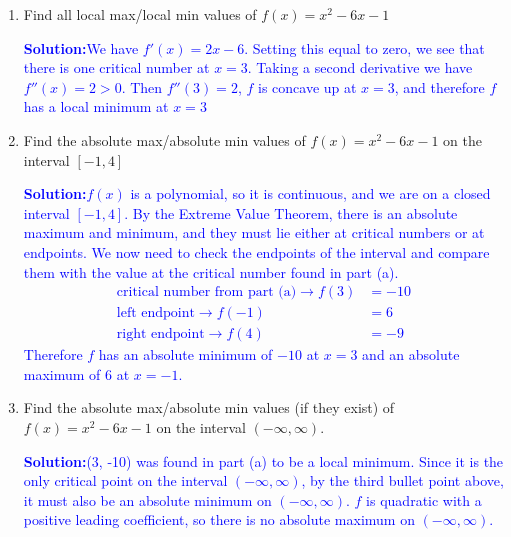 \documentclass[letterpaper,11pt]{article}
\newcommand{\sol}[2]{\begin{minipage}[c][#1]{\linewidth}{\textcolor{blue}{\textbf{Solution:}}\quad \textcolor{blue}{#2}}\end{minipage}}
\newcommand{\sol}[2]{\begin{minipage}[c][#1]{\linewidth}{\vfill}\end{minipage}}
\begin{document}
\begin{enumerate}
\item  Find all local max/local min values of $f(x)=x^2-6x -1$ 

\sol{.8 in}{We have $f'(x)=2x-6$. Setting this equal to zero, we see that there is one critical number at $x=3$. Taking a second derivative we have $f''(x)=2 > 0$. Then $f''(3)=2$, $f$ is concave up at $x=3$, and therefore $f$ has a local minimum at $x=3$}

\item  Find the absolute max/absolute min values of $f(x)=x^2-6x -1$ on the interval $[-1, 4]$

\sol{2 in}{$f(x)$ is a polynomial, so it is continuous, and we are on a closed interval $[-1,4]$. By the Extreme Value Theorem, there is an absolute maximum and minimum, and they must lie either at critical numbers or at endpoints. We now need to check the endpoints of the interval and compare them with the value at the critical number found in part (a). 
\begin{align*}
\text{critical number from part (a)} \longrightarrow f(3)&=-10 \\
\text{left endpoint} \longrightarrow f(-1)&=6 \\
\text{right endpoint} \longrightarrow f(4)&=-9
\end{align*}
Therefore $f$ has an absolute minimum of $-10$ at $x=3$ and an absolute maximum of 6 at $x=-1$.
}

\item  Find the absolute max/absolute min values (if they exist) of $f(x)=x^2-6x -1$ on the interval $(-\infty, \infty)$.

\sol{1.2in}{(3, -10) was found in part (a) to be a local minimum. Since it is the only critical point on the interval $(-\infty, \infty)$, by the third bullet point above, it must also be an absolute minimum on $(-\infty, \infty)$. $f$ is quadratic with a positive leading coefficient, so there is no absolute maximum on $(-\infty, \infty)$.}

\end{enumerate}
\end{document}
